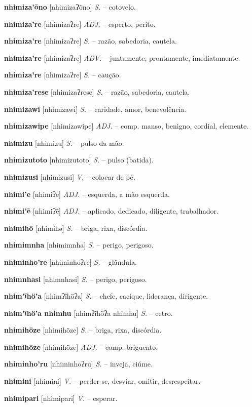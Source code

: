 \textbf{nhimiza'õno} [nhimizaʔõno] \textit{S.} -- cotovelo.

\textbf{nhimiza're} [nhimizaʔre] \textit{ADJ.} -- esperto, perito.

\textbf{nhimiza're} [nhimizaʔre] \textit{S.} -- razão, sabedoria, cautela.

\textbf{nhimiza're} [nhimizaʔre] \textit{ADV.} -- juntamente, prontamente, imediatamente.

\textbf{nhimiza're} [nhimizaʔre] \textit{S.} -- caução.

\textbf{nhimiza'rese} [nhimizaʔrese] \textit{S.} -- razão, sabedoria, cautela.

\textbf{nhimizawi} [nhimizawi] \textit{S.} -- caridade, amor, benevolência.

\textbf{nhimizawipe} [nhimizawipe] \textit{ADJ.} -- comp. manso, benigno, cordial, clemente.

\textbf{nhimizu} [nhimizu] \textit{S.} -- pulso da mão.

\textbf{nhimizutoto} [nhimizutoto] \textit{S.} -- pulso (batida).

\textbf{nhimizusi} [nhimizusi] \textit{V.} -- colocar de pé.

\textbf{nhimi'e} [nhimiʔe] \textit{ADJ.} -- esquerda, a mão esquerda.

\textbf{nhimi'ẽ} [nhimiʔẽ] \textit{ADJ.} -- aplicado, dedicado, diligente, trabalhador.

\textbf{nhimihö} [nhimihə] \textit{S.} -- briga, rixa, discórdia.

\textbf{nhimimnha} [nhimimnha] \textit{S.} -- perigo, perigoso.

\textbf{nhiminho're} [nhiminhoʔre] \textit{S.} -- glândula.

\textbf{nhimnhasi} [nhimnhasi] \textit{S.} -- perigo, perigoso.

\textbf{nhim'ĩhö'a} [nhimʔĩhöʔa] \textit{S.} -- chefe, cacique, liderança, dirigente.

\textbf{nhim'ĩhö'a nhimhu} [nhimʔĩhöʔa nhimhu] \textit{S.} -- cetro.

\textbf{nhimihöze} [nhimihöze] \textit{S.} -- briga, rixa, discórdia.

\textbf{nhimihöze} [nhimihöze] \textit{ADJ.} -- comp. briguento.

\textbf{nhiminho'ru} [nhiminhoʔru] \textit{S.} -- inveja, ciúme.

\textbf{nhimini} [nhimini] \textit{V.} -- perder-se, desviar, omitir, desrespeitar.

\textbf{nhimipari} [nhimipari] \textit{V.} -- esperar.

